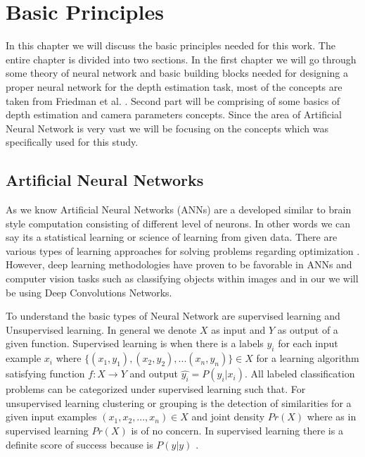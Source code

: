 
\chapter{Basic Principles}
\label{Chapter2:Background} 

In this chapter we will discuss the basic  principles needed for this work. The entire chapter is divided into two sections. In the first chapter we will go through some theory of neural network and basic building blocks  needed for designing a proper neural network for the depth estimation task, most of the concepts are taken from Friedman et al. \cite{friedman2001elements}. Second part will be comprising of some basics of depth estimation and camera parameters concepts. Since the area of Artificial Neural Network is very vast we will be focusing on the concepts which was specifically used for this study. 

\section{Artificial Neural Networks}

As we know Artificial Neural Networks (ANNs) are a developed similar to brain style computation consisting of different level of neurons. In other words we can say its a statistical learning or science of learning from given data. There are various types of learning approaches for solving problems
regarding optimization \cite{friedman2001elements}. However, deep learning methodologies have proven to be favorable in ANNs and computer vision tasks such as classifying objects within images and in our we will be using Deep Convolutions Networks. 

To understand the basic types of Neural Network are supervised learning and Unsupervised learning. In general we denote \(X\) as input and \(Y\) as output of a given function. Supervised learning is when there is a labels \(y_{i}\) for each input example \(x_{i}\) where    \(\{(x_{1},y_{1}),(x_{2},y_{2}),...(x_{n},y_{n})\} \in X\) for a learning algorithm satisfying function \(f:X \rightarrow Y\) and output \( \hat{y_{i}} = P (y_{i}|x_{i})\). All labeled classification problems can be categorized under supervised learning such that. For  unsupervised learning clustering or grouping is the detection of similarities for a given input examples \({(x_{1},x_{2},...,x_{n})} \in X\) and joint density \(Pr(X)\)  where as in supervised learning \(Pr(X)\) is of no concern. In supervised learning there is a definite score of success because is \(P(y|y)\) \cite{friedman2001elements}. 

